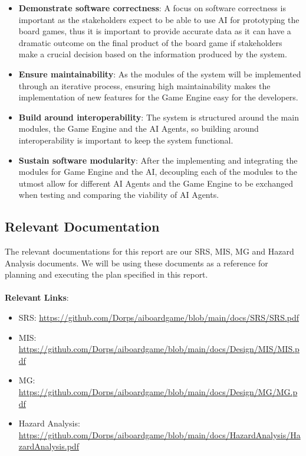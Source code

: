 \documentclass[12pt, titlepage]{article}
\begin{document}
\begin{itemize}
    \item \textbf{Demonstrate software correctness}: A focus on software correctness is important as the stakeholders expect to be able to use AI for prototyping the board games, thus it is important to provide accurate data as it can have a dramatic outcome on the final product of the board game if stakeholders make a crucial decision based on the information produced by the system.
    \item \textbf{Ensure maintainability}: As the modules of the system will be implemented through an iterative process, ensuring high maintainability makes the implementation of new features for the Game Engine easy for the developers.
    \item \textbf{Build around interoperability}: The system is structured around the main modules, the Game Engine and the AI Agents, so building around interoperability is important to keep the system functional.
    \item \textbf{Sustain software modularity}: After the implementing and integrating the modules for Game Engine and the AI, decoupling each of the modules to the utmost allow for different AI Agents and the Game Engine to be exchanged when testing and comparing the viability of AI Agents. 
\end{itemize}


\subsection{Relevant Documentation}
  
The relevant documentations for this report are our SRS, MIS, MG and Hazard Analysis documents. We will be using these documents as a reference for planning and executing the plan specified in this report. 
\\\\
\textbf{Relevant Links}:
\begin{itemize}
    \item SRS: \url{https://github.com/Dorps/aiboardgame/blob/main/docs/SRS/SRS.pdf}
    \item MIS: \url{https://github.com/Dorps/aiboardgame/blob/main/docs/Design/MIS/MIS.pdf}
    \item MG: \url{https://github.com/Dorps/aiboardgame/blob/main/docs/Design/MG/MG.pdf}
    \item Hazard Analysis: \url{https://github.com/Dorps/aiboardgame/blob/main/docs/HazardAnalysis/HazardAnalysis.pdf}
\end{itemize}
\end{document}
